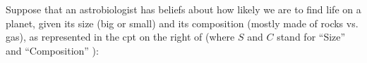 \documentclass{article}
\newcommand{\commentout}[1]{\ignorespaces}
\numberwithin{equation}{section}
\begin{document}
\begin{notfocus}
\commentout{The modularity of PDGs is useful even when there is no inconsistency, as the following example shows. } 

	
	\begin{example} \label{ex:planet}
		Suppose that an astrobiologist has beliefs about how 
		likely we are to find life on a
		planet, given its size (big or small) and
		its composition (mostly made of rocks vs. gas), as represented
		in the cpt on the right of  (where $S$ and
		$C$ stand for ``Size'' and ``Composition''%
		): 
		

\end{example}
\end{notfocus}
\end{document}
